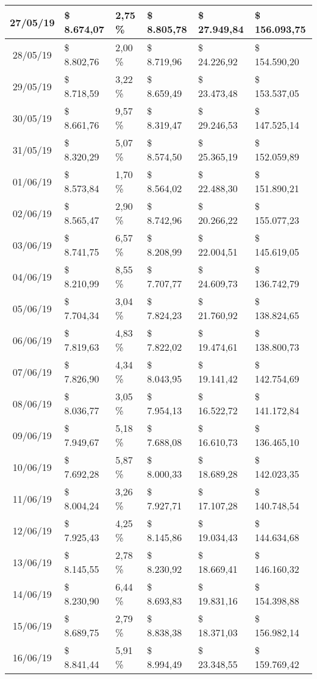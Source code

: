 \begin{small}
\begin{longtable}{|c|l|l|l|l|l|}
27/05/19 & \$ 8.674,07 & 2,75 \% & \$ 8.805,78 & \$ 27.949,84 & \$ 156.093,75 \\ \hline
28/05/19 & \$ 8.802,76 & 2,00 \% & \$ 8.719,96 & \$ 24.226,92 & \$ 154.590,20 \\ \hline
29/05/19 & \$ 8.718,59 & 3,22 \% & \$ 8.659,49 & \$ 23.473,48 & \$ 153.537,05 \\ \hline
30/05/19 & \$ 8.661,76 & 9,57 \% & \$ 8.319,47 & \$ 29.246,53 & \$ 147.525,14 \\ \hline
31/05/19 & \$ 8.320,29 & 5,07 \% & \$ 8.574,50 & \$ 25.365,19 & \$ 152.059,89 \\ \hline
01/06/19 & \$ 8.573,84 & 1,70 \% & \$ 8.564,02 & \$ 22.488,30 & \$ 151.890,21 \\ \hline
02/06/19 & \$ 8.565,47 & 2,90 \% & \$ 8.742,96 & \$ 20.266,22 & \$ 155.077,23 \\ \hline
03/06/19 & \$ 8.741,75 & 6,57 \% & \$ 8.208,99 & \$ 22.004,51 & \$ 145.619,05 \\ \hline
04/06/19 & \$ 8.210,99 & 8,55 \% & \$ 7.707,77 & \$ 24.609,73 & \$ 136.742,79 \\ \hline
05/06/19 & \$ 7.704,34 & 3,04 \% & \$ 7.824,23 & \$ 21.760,92 & \$ 138.824,65 \\ \hline
06/06/19 & \$ 7.819,63 & 4,83 \% & \$ 7.822,02 & \$ 19.474,61 & \$ 138.800,73 \\ \hline
07/06/19 & \$ 7.826,90 & 4,34 \% & \$ 8.043,95 & \$ 19.141,42 & \$ 142.754,69 \\ \hline
08/06/19 & \$ 8.036,77 & 3,05 \% & \$ 7.954,13 & \$ 16.522,72 & \$ 141.172,84 \\ \hline
09/06/19 & \$ 7.949,67 & 5,18 \% & \$ 7.688,08 & \$ 16.610,73 & \$ 136.465,10 \\ \hline
10/06/19 & \$ 7.692,28 & 5,87 \% & \$ 8.000,33 & \$ 18.689,28 & \$ 142.023,35 \\ \hline
11/06/19 & \$ 8.004,24 & 3,26 \% & \$ 7.927,71 & \$ 17.107,28 & \$ 140.748,54 \\ \hline
12/06/19 & \$ 7.925,43 & 4,25 \% & \$ 8.145,86 & \$ 19.034,43 & \$ 144.634,68 \\ \hline
13/06/19 & \$ 8.145,55 & 2,78 \% & \$ 8.230,92 & \$ 18.669,41 & \$ 146.160,32 \\ \hline
14/06/19 & \$ 8.230,90 & 6,44 \% & \$ 8.693,83 & \$ 19.831,16 & \$ 154.398,88 \\ \hline
15/06/19 & \$ 8.689,75 & 2,79 \% & \$ 8.838,38 & \$ 18.371,03 & \$ 156.982,14 \\ \hline
16/06/19 & \$ 8.841,44 & 5,91 \% & \$ 8.994,49 & \$ 23.348,55 & \$ 159.769,42 \\ \hline

\end{longtable}
\end{small}
